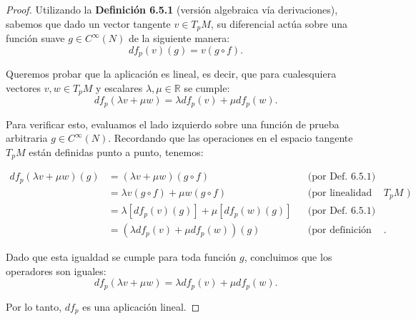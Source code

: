 \documentclass{article}
\begin{document}
\begin{proof}
    Utilizando la \textbf{Definición 6.5.1} (versión algebraica vía derivaciones), sabemos que dado un vector tangente \( v \in T_p M \), su diferencial actúa sobre una función suave \( g \in C^{\infty}(N) \) de la siguiente manera:
    \begin{equation*}
        df_p(v)(g) = v(g \circ f).
    \end{equation*}

    Queremos probar que la aplicación es lineal, es decir, que para cualesquiera vectores \( v, w \in T_p M \) y escalares \( \lambda, \mu \in \mathbb{R} \) se cumple:
    \begin{equation*}
        df_p(\lambda v + \mu w) = \lambda df_p(v) + \mu df_p(w).
    \end{equation*}

    Para verificar esto, evaluamos el lado izquierdo sobre una función de prueba arbitraria \( g \in C^{\infty}(N) \). Recordando que las operaciones en el espacio tangente \( T_p M \) están definidas punto a punto, tenemos:

    \begin{align*}
        df_p(\lambda v + \mu w)(g) & = (\lambda v + \mu w)(g \circ f)                                    &  & \text{(por Def. 6.5.1)}                          \\
                                   & = \lambda v(g \circ f) + \mu w(g \circ f)                           &  & \text{(por linealidad en } T_p M\text{ ) }       \\
                                   & = \lambda \left[ df_p(v)(g) \right] + \mu \left[ df_p(w)(g) \right] &  & \text{(por Def. 6.5.1)}                          \\
                                   & = (\lambda df_p(v) + \mu df_p(w))(g)                                &  & \text{(por definición de suma en el codominio)}.
    \end{align*}

    Dado que esta igualdad se cumple para toda función \( g \), concluimos que los operadores son iguales:
    \[
        df_p(\lambda v + \mu w) = \lambda df_p(v) + \mu df_p(w).
    \]

    Por lo tanto, \( df_p \) es una aplicación lineal.
\end{proof}
\end{document}
